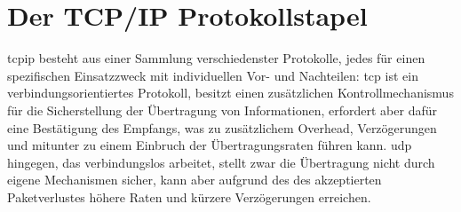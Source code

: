 \section{Der TCP/IP Protokollstapel}
\label{chapter:grundlagen:tcpip}

\gls{tcpip} besteht aus einer Sammlung verschiedenster Protokolle, jedes für einen spezifischen Einsatzzweck mit individuellen Vor- und Nachteilen: \gls{tcp} \zB ist ein verbindungsorientiertes Protokoll, besitzt einen zusätzlichen Kontrollmechanismus für die Sicherstellung der Übertragung von Informationen, erfordert aber dafür eine Bestätigung des Empfangs, was zu zusätzlichem Overhead, Verzögerungen und mitunter zu einem Einbruch der Übertragungsraten führen kann. \gls{udp} hingegen, das verbindungslos arbeitet, stellt zwar die Übertragung nicht durch eigene Mechanismen sicher, kann aber aufgrund des des akzeptierten Paketverlustes höhere Raten und kürzere Verzögerungen erreichen. %



